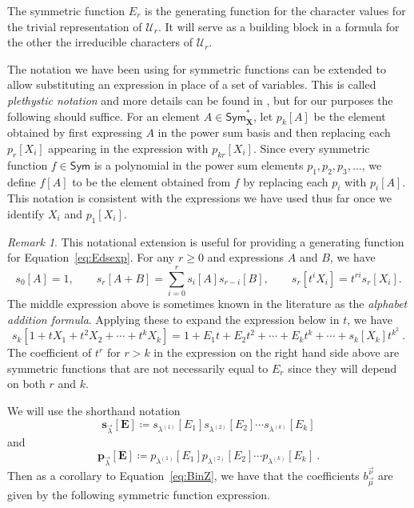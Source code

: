 \documentclass[10pt]{amsart}
\theoremstyle{definition}
\theoremstyle{remark}
\newtheorem{remark}[theorem]{Remark}
\newcommand{\defncolor}{\color{darkred}}
\newcommand{\defn}[1]{{\defncolor\emph{#1}}} %
\newcommand{\XXX}{\mathbf{X}}
\newcommand{\EEE}{\mathbf{E}}
\begin{document}
The symmetric function $E_r$ is the generating function
for the character values for the trivial representation of $\mathcal{U}_r$. It will serve as
a building block in a formula for the other the irreducible characters of $\mathcal{U}_r$.

The notation we have been using for symmetric functions can be extended
to allow substituting an expression in place of a set of variables.
This is called \defn{plethystic notation} and more details can be found in \cite{LR},
but for our purposes the following should suffice.
For an element $A \in \mathsf{Sym}^{\ast}_{\XXX}$, let $p_k[A]$ be the element
obtained by first expressing $A$ in the power sum basis and then
replacing each $p_r[X_i]$ appearing in the expression with $p_{kr}[X_i]$.
Since every symmetric function $f \in \mathsf{Sym}$ is a polynomial in the power sum elements
$p_1, p_2, p_3, \ldots$, we define $f[A]$ to be the element obtained from $f$ by
replacing each $p_i$ with $p_i[A]$.
This notation is consistent with the expressions we have used thus far once we identify $X_i$ and $p_1[X_i]$.

\begin{remark}
This notational extension is useful for
providing a generating function for
Equation~\eqref{eq:Edsexp}.  For any $r\geqslant0$ and
expressions $A$ and $B$, we have
\begin{equation*}
s_0[A] = 1,
\qquad
s_r[A+B] = \sum_{i=0}^r s_i[A] s_{r-i}[B],
\qquad
s_r[t^i X_i] = t^{ri} s_r[X_i].
\end{equation*}
The middle expression above is sometimes known in the literature as the
\emph{alphabet addition formula}. Applying these to expand the
expression below in $t$, we have
\[
    s_k[1 + t X_1 + t^2 X_2 + \cdots + t^k X_k]
    = 1 + E_1 t + E_2 t^2 + \cdots + E_k t^k + \cdots + s_k[X_k] t^{k^2}~.
\]
The coefficient of $t^r$ for $r>k$ in the expression on the
right hand side above are symmetric functions that are
not necessarily equal to $E_r$ since they will depend on both $r$ and $k$.
\end{remark}

We will use the shorthand notation
$$\mathbf{s}_{\vec{\lambda}}[\EEE] \coloneqq s_{\lambda^{(1)}}[E_1]s_{\lambda^{(2)}}[E_2]
\cdots s_{\lambda^{(k)}}[E_k]$$
and
$$\mathbf{p}_{\vec{\lambda}}[\EEE] \coloneqq p_{\lambda^{(1)}}[E_1]p_{\lambda^{(2)}}[E_2]
\cdots p_{\lambda^{(k)}}[E_k]~.$$
Then as a corollary to Equation~\eqref{eq:BinZ}, we have that the
coefficients $b_{\vec{\mu}}^{\vec{\nu}}$ are given by the following symmetric function expression.
\end{document}
